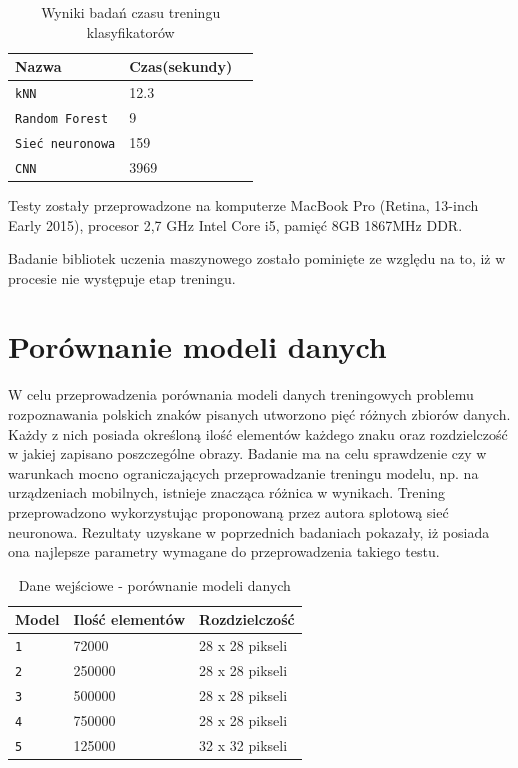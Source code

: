 \documentclass[brudnopis]{xmgr}
\begin{document}
\begin{table}[!htb]
\begin{tabular}{|l|l|l|} \hline
Nazwa & Czas(sekundy) \\ \hline
\texttt{kNN} & 12.3 \\ \hline
\texttt{Random Forest} & 9 \\ \hline
\texttt{Sieć neuronowa} & 159 \\ \hline
\texttt{CNN}     & 3969 \\ \hline
\end{tabular}
\caption{Wyniki badań czasu treningu klasyfikatorów}
\end{table}

Testy zostały przeprowadzone na komputerze MacBook Pro
(Retina, 13-inch Early 2015), procesor 2,7 GHz Intel Core i5, pamięć 8GB 1867MHz DDR.

Badanie bibliotek uczenia maszynowego zostało pominięte ze względu na to, iż w procesie nie występuje etap treningu.

\section{Porównanie modeli danych}

W celu przeprowadzenia porównania modeli danych treningowych problemu rozpoznawania polskich znaków pisanych utworzono pięć różnych zbiorów danych. Każdy z nich posiada określoną ilość elementów każdego znaku oraz rozdzielczość w jakiej zapisano poszczególne obrazy. Badanie ma na celu sprawdzenie czy w warunkach mocno ograniczających przeprowadzanie treningu modelu, np. na urządzeniach mobilnych, istnieje znacząca różnica w wynikach. Trening przeprowadzono wykorzystując proponowaną przez autora splotową sieć neuronowa. Rezultaty uzyskane w poprzednich badaniach pokazały, iż posiada ona najlepsze parametry wymagane do przeprowadzenia takiego testu.

\begin{table}[!htb]
\begin{tabular}{|l|l|l|} \hline
Model & Ilość elementów & Rozdzielczość  \\ \hline
\texttt 1 & 72000 & 28 x 28 pikseli \\ \hline
\texttt 2 & 250000 & 28 x 28 pikseli \\ \hline
\texttt 3 & 500000 & 28 x 28 pikseli \\ \hline
\texttt 4 & 750000 & 28 x 28 pikseli \\ \hline
\texttt 5 & 125000 & 32 x 32 pikseli \\ \hline
\end{tabular}
\caption{Dane wejściowe - porównanie modeli danych}
\end{table}
\end{document}
